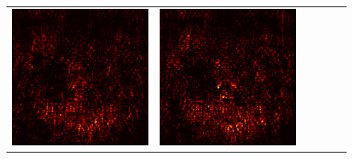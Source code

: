 \documentclass[preprint,12pt]{elsarticle}
\begin{document}
\begin{figure}[p]
\begin{tabular}{cccccc}
  \includegraphics[scale=\scale]{../visualizations/examples/imagenette/resnet18/active_saliency_map/6.png} & 
  \includegraphics[scale=\scale]{../visualizations/examples/imagenette/resnet18/inactive_saliency_map/6.png} \\
  

\end{tabular}
\end{figure}
\end{document}
